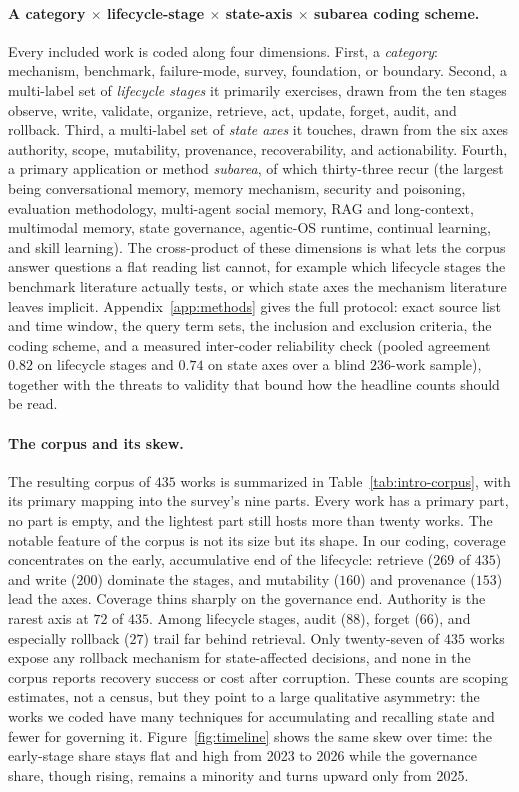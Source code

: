 \paragraph{A category $\times$ lifecycle-stage $\times$ state-axis $\times$ subarea coding scheme.} Every included work is coded along four dimensions. First, a \emph{category}: mechanism, benchmark, failure-mode, survey, foundation, or boundary. Second, a multi-label set of \emph{lifecycle stages} it primarily exercises, drawn from the ten stages observe, write, validate, organize, retrieve, act, update, forget, audit, and rollback. Third, a multi-label set of \emph{state axes} it touches, drawn from the six axes authority, scope, mutability, provenance, recoverability, and actionability. Fourth, a primary application or method \emph{subarea}, of which thirty-three recur (the largest being conversational memory, memory mechanism, security and poisoning, evaluation methodology, multi-agent social memory, RAG and long-context, multimodal memory, state governance, agentic-OS runtime, continual learning, and skill learning). The cross-product of these dimensions is what lets the corpus answer questions a flat reading list cannot, for example which lifecycle stages the benchmark literature actually tests, or which state axes the mechanism literature leaves implicit. Appendix~\ref{app:methods} gives the full protocol: exact source list and time window, the query term sets, the inclusion and exclusion criteria, the coding scheme, and a measured inter-coder reliability check (pooled agreement $0.82$ on lifecycle stages and $0.74$ on state axes over a blind $236$-work sample), together with the threats to validity that bound how the headline counts should be read.

\paragraph{The corpus and its skew.} The resulting corpus of $435$ works is summarized in Table~\ref{tab:intro-corpus}, with its primary mapping into the survey's nine parts. Every work has a primary part, no part is empty, and the lightest part still hosts more than twenty works. The notable feature of the corpus is not its size but its shape. In our coding, coverage concentrates on the early, accumulative end of the lifecycle: retrieve ($269$ of $435$) and write ($200$) dominate the stages, and mutability ($160$) and provenance ($153$) lead the axes. Coverage thins sharply on the governance end. Authority is the rarest axis at $72$ of $435$. Among lifecycle stages, audit ($88$), forget ($66$), and especially rollback ($27$) trail far behind retrieval. Only twenty-seven of $435$ works expose any rollback mechanism for state-affected decisions, and none in the corpus reports recovery success or cost after corruption. These counts are scoping estimates, not a census, but they point to a large qualitative asymmetry: the works we coded have many techniques for accumulating and recalling state and fewer for governing it. Figure~\ref{fig:timeline} shows the same skew over time: the early-stage share stays flat and high from 2023 to 2026 while the governance share, though rising, remains a minority and turns upward only from 2025.

